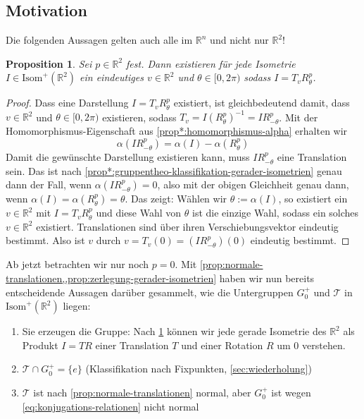 \documentclass[a4paper, ngerman]{article}
\newcounter{chapter}
\numberwithin{equation}{chapter}
\theoremstyle{plain}
\newtheorem{proposition}{Proposition}[chapter]
\theoremstyle{definition}
\newcommand{\geradisometr}{\ensuremath{\mathrm{Isom}^+(\mathbb R^2)}}
\newcommand{\anm}[1]{{\color{red} #1}}
\begin{document}
\subsection{Motivation}
Die folgenden Aussagen gelten auch alle im \(\mathbb R^n\) und nicht nur \(\mathbb R^2\)!
\begin{proposition}\label{prop:zerlegung-gerader-isometrien}
    Sei \(p \in \mathbb R^2\) fest. Dann existieren für jede Isometrie \(I \in \geradisometr\) ein eindeutiges \(v \in \mathbb R^2\) und \(\theta \in [0,2\pi)\) sodass \(I = T_v R_\theta^p\).  
\end{proposition}
\begin{proof}
    Dass eine Darstellung \(I = T_v R_\theta^p\) existiert, ist gleichbedeutend damit, dass \(v \in \mathbb R^2\) und \(\theta\in [0,2\pi)\) existieren, sodass \(T_v = I(R_\theta^p)^{-1} = I R_{-\theta}^p\). Mit der Homomorphismus-Eigenschaft aus \cref{prop*:homomorphismus-alpha} erhalten wir 
    \begin{equation*}
        \alpha(IR_{-\theta}^p) = \alpha(I) - \alpha(R_\theta^p)
    \end{equation*}
    Damit die gewünschte Darstellung existieren kann, muss \(IR_{-\theta}^p\) eine Translation sein. Das ist nach \cref{prop*:gruppentheo-klassifikation-gerader-isometrien} genau dann der Fall, wenn \(\alpha(IR_{-\theta}^p) = 0\), also mit der obigen Gleichheit genau dann, wenn \(\alpha(I) = \alpha(R_\theta^p) = \theta\). Das zeigt: Wählen wir \(\theta := \alpha(I)\), so existiert ein \(v \in \mathbb R^2\) mit \(I = T_v R_\theta^p\) und diese Wahl von \(\theta\) ist die einzige Wahl, sodass ein solches \(v \in \mathbb R^2\) existiert. Translationen sind über ihren Verschiebungsvektor eindeutig bestimmt. Also ist \(v\) durch \(v = T_v(0) = (IR_{-\theta}^p) (0)\) eindeutig bestimmt. 
\end{proof}
Ab jetzt betrachten wir nur noch \(p=0\). Mit \cref{prop:normale-translationen,,prop:zerlegung-gerader-isometrien} haben wir nun bereits entscheidende Aussagen darüber gesammelt, wie die Untergruppen \(G_0^+\) und \(\mathcal T\) in \(\geradisometr\) liegen: 
\begin{enumerate}
    \item Sie erzeugen die Gruppe: Nach \cref{prop:zerlegung-gerader-isometrien} können wir jede gerade Isometrie des \(\mathbb R^2\) als Produkt \(I=TR\) einer Translation \(T\) und einer Rotation \(R\) um \(0\) verstehen. 
    \item \(\mathcal T \cap G_0^+ = \{e\}\) (Klassifikation nach Fixpunkten, \cref{sec:wiederholung}) %
    \item \(\mathcal T\) ist nach \cref{prop:normale-translationen} normal, aber \(G_0^+\) ist wegen \eqref{eq:konjugations-relationen} nicht normal %
\end{enumerate}
\end{document}
